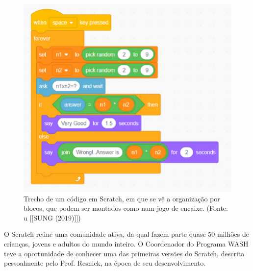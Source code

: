 \documentclass[
12pt,		%
openright,	%
twoside,  %
a4paper,			%
chapter=TITLE,		%
english,			%
french,				%
spanish,			%
brazil				%
]{USPSC-classe/USPSC}
\begin{document}
\captionsetup{format=plain}
\begin{figure}[max size={\textwidth}{\textheight}]

\centering


\begin{minipage}[b]{0.4\linewidth}
        \centering
                \includegraphics[width=1.0\linewidth]{../../imagens/Scratch-Block.png}
                \caption{Trecho de um c\'odigo em Scratch, em que se v\^e a organiza\c{c}\~ao por blocos, que podem ser montados como num jogo de encaixe. (Fonte: u [[SUNG (2019)]])}
                \label{5cac9c9edeb34a88b5571069bb494cda1ce1bd9c}
\end{minipage}%
\hspace{0.5cm}
\end{figure}



O Scratch re\'une uma comunidade ativa, da qual fazem parte quase 50 milh\~oes de crian\c{c}as, jovens e adultos do mundo inteiro. O Coordenador do Programa WASH teve a oportunidade de conhecer uma das primeiras vers\~oes do Scratch, descrita pessoalmente pelo Prof. Resnick, na \'epoca de seu desenvolvimento.
\end{document}
